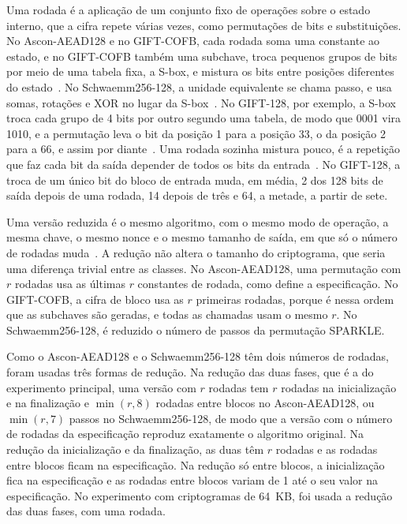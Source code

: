 Uma rodada é a aplicação de um conjunto fixo de operações sobre o estado interno, que a cifra repete várias vezes, como permutações de bits e substituições. No Ascon-AEAD128 e no GIFT-COFB, cada rodada soma uma constante ao estado, e no GIFT-COFB também uma subchave, troca pequenos grupos de bits por meio de uma tabela fixa, a S-box, e mistura os bits entre posições diferentes do estado~\cite{nist_sp800232_2025,Banik2017}. No Schwaemm256-128, a unidade equivalente se chama passo, e usa somas, rotações e XOR no lugar da S-box~\cite{Beierle2021SparkleSub}. No GIFT-128, por exemplo, a S-box troca cada grupo de 4 bits por outro segundo uma tabela, de modo que 0001 vira 1010, e a permutação leva o bit da posição 1 para a posição 33, o da posição 2 para a 66, e assim por diante~\cite{Banik2017}. Uma rodada sozinha mistura pouco, é a repetição que faz cada bit da saída depender de todos os bits da entrada~\cite{shannon_1949}. No GIFT-128, a troca de um único bit do bloco de entrada muda, em média, 2 dos 128 bits de saída depois de uma rodada, 14 depois de três e 64, a metade, a partir de sete.

Uma versão reduzida é o mesmo algoritmo, com o mesmo modo de operação, a mesma chave, o mesmo nonce e o mesmo tamanho de saída, em que só o número de rodadas muda~\cite{Dobraunig2021AsconSecurity,Rohit2021Ascon,gohr_2019}. A redução não altera o tamanho do criptograma, que seria uma diferença trivial entre as classes. No Ascon-AEAD128, uma permutação com $r$ rodadas usa as últimas $r$ constantes de rodada, como define a especificação. No GIFT-COFB, a cifra de bloco usa as $r$ primeiras rodadas, porque é nessa ordem que as subchaves são geradas, e todas as chamadas usam o mesmo $r$. No Schwaemm256-128, é reduzido o número de passos da permutação SPARKLE.

Como o Ascon-AEAD128 e o Schwaemm256-128 têm dois números de rodadas, foram usadas três formas de redução. Na redução das duas fases, que é a do experimento principal, uma versão com $r$ rodadas tem $r$ rodadas na inicialização e na finalização e $\min(r, 8)$ rodadas entre blocos no Ascon-AEAD128, ou $\min(r, 7)$ passos no Schwaemm256-128, de modo que a versão com o número de rodadas da especificação reproduz exatamente o algoritmo original. Na redução da inicialização e da finalização, as duas têm $r$ rodadas e as rodadas entre blocos ficam na especificação. Na redução só entre blocos, a inicialização fica na especificação e as rodadas entre blocos variam de 1 até o seu valor na especificação. No experimento com criptogramas de 64~KB, foi usada a redução das duas fases, com uma rodada.

